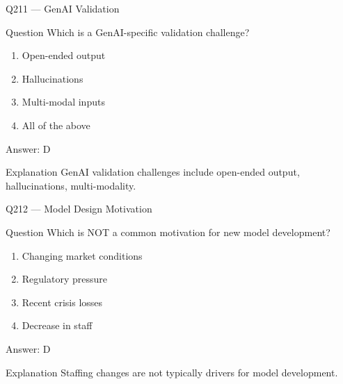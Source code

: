 \documentclass[aspectratio=169,8pt]{beamer}
\begin{document}
								\begin{frame}{Q211 --- GenAI Validation}
									\begin{block}{Question}
										Which is a GenAI-specific validation challenge?
										\begin{enumerate}
											\item Open-ended output
											\item Hallucinations
											\item Multi-modal inputs
											\item All of the above
										\end{enumerate}
									\end{block}
									\begin{exampleblock}{Answer: D}\end{exampleblock}
									\begin{block}{Explanation}
										GenAI validation challenges include open-ended output, hallucinations, multi-modality.
									\end{block}
								\end{frame}
								
								\begin{frame}{Q212 --- Model Design Motivation}
									\begin{block}{Question}
										Which is NOT a common motivation for new model development?
										\begin{enumerate}
											\item Changing market conditions
											\item Regulatory pressure
											\item Recent crisis losses
											\item Decrease in staff
										\end{enumerate}
									\end{block}
									\begin{exampleblock}{Answer: D}\end{exampleblock}
									\begin{block}{Explanation}
										Staffing changes are not typically drivers for model development.
									\end{block}
								\end{frame}
								
\end{document}
